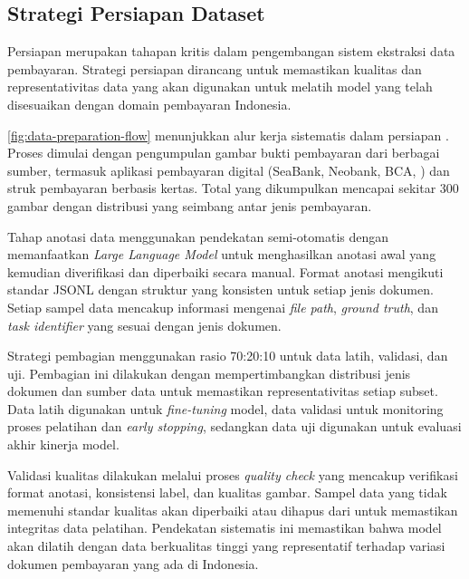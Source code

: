 \subsection{Strategi Persiapan Dataset}
\label{subsec:strategi-persiapan-dataset}

Persiapan \dataset{} merupakan tahapan kritis dalam pengembangan sistem ekstraksi data pembayaran. Strategi persiapan \dataset{} dirancang untuk memastikan kualitas dan representativitas data yang akan digunakan untuk melatih model \donut{} yang telah disesuaikan dengan domain pembayaran Indonesia.


\autoref{fig:data-preparation-flow} menunjukkan alur kerja sistematis dalam persiapan \dataset. Proses dimulai dengan pengumpulan gambar bukti pembayaran dari berbagai sumber, termasuk aplikasi pembayaran digital (SeaBank, Neobank, BCA, \gopay) dan struk pembayaran berbasis kertas. Total \dataset{} yang dikumpulkan mencapai sekitar 300 gambar dengan distribusi yang seimbang antar jenis pembayaran.

Tahap anotasi data menggunakan pendekatan semi-otomatis dengan memanfaatkan \emph{Large Language Model} untuk menghasilkan anotasi awal yang kemudian diverifikasi dan diperbaiki secara manual. Format anotasi mengikuti standar JSONL dengan struktur yang konsisten untuk setiap jenis dokumen. Setiap sampel data mencakup informasi mengenai \emph{file path}, \emph{ground truth}, dan \emph{task identifier} yang sesuai dengan jenis dokumen.

Strategi pembagian \dataset{} menggunakan rasio 70:20:10 untuk data latih, validasi, dan uji. Pembagian ini dilakukan dengan mempertimbangkan distribusi jenis dokumen dan sumber data untuk memastikan representativitas setiap subset. Data latih digunakan untuk \emph{fine-tuning} model, data validasi untuk monitoring proses pelatihan dan \emph{early stopping}, sedangkan data uji digunakan untuk evaluasi akhir kinerja model.

Validasi kualitas \dataset{} dilakukan melalui proses \emph{quality check} yang mencakup verifikasi format anotasi, konsistensi label, dan kualitas gambar. Sampel data yang tidak memenuhi standar kualitas akan diperbaiki atau dihapus dari \dataset{} untuk memastikan integritas data pelatihan. Pendekatan sistematis ini memastikan bahwa model akan dilatih dengan data berkualitas tinggi yang representatif terhadap variasi dokumen pembayaran yang ada di Indonesia.
